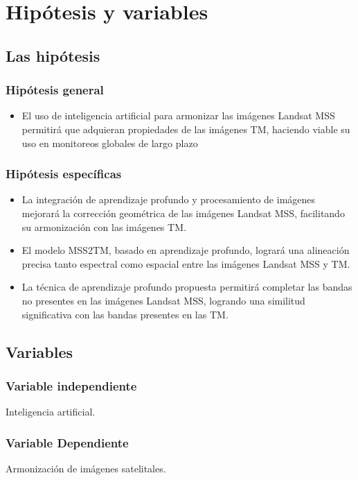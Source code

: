 \Chapter{}
\chapter{Hipótesis y variables}
    \section{Las hipótesis}
        \subsection{Hipótesis general}
            \begin{itemize}
                \item[-] El uso de inteligencia artificial para armonizar las imágenes Landsat MSS permitirá que adquieran propiedades de las imágenes TM, haciendo viable su uso en monitoreos globales de largo plazo
            \end{itemize}
        \subsection{Hipótesis específicas}
            \begin{itemize}
                \item[-] La integración de aprendizaje profundo y procesamiento de imágenes mejorará la corrección geométrica de las imágenes Landsat MSS, facilitando su armonización con las imágenes TM.
                \item[-] El modelo MSS2TM, basado en aprendizaje profundo, logrará una alineación precisa tanto espectral como espacial entre las imágenes Landsat MSS y TM.
                \item[-] La técnica de aprendizaje profundo propuesta permitirá completar las bandas no presentes en las imágenes Landsat MSS, logrando una similitud significativa con las bandas presentes en las TM.
            \end{itemize}
    \section{Variables}
        \subsection{Variable independiente}
            Inteligencia artificial. %
        \subsection{Variable Dependiente}
            Armonización de imágenes satelitales. %
            
